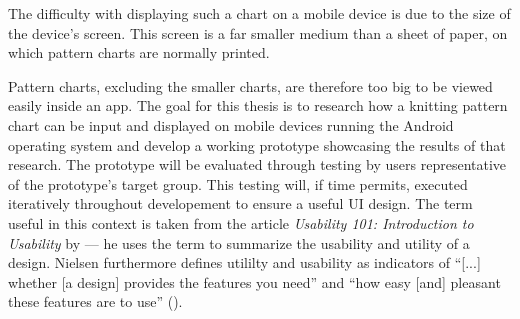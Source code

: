 The difficulty with displaying such a chart on a mobile device is due to the size of the device's screen. This screen is a far smaller medium than a sheet of paper, on which pattern charts are normally printed. 

Pattern charts, excluding the smaller charts, are therefore too big to be viewed easily inside an app. The goal for this thesis is to research how a knitting pattern chart can be input and displayed on mobile devices running the Android operating system and develop a working prototype showcasing the results of that research. The prototype will be evaluated through testing by users representative of the prototype's target group. This testing will, if time permits, executed iteratively throughout developement to ensure a useful \gls{UI} design. The term useful in this context is taken from the article \textit{Usability 101: Introduction to Usability} by \cite{nielsen2014} --- he uses the term to summarize the usability and utility of a design. Nielsen furthermore defines utililty and usability as indicators of ``[...] whether [a design] provides the features you need'' and ``how easy [and] pleasant these features are to use'' (\cite{nielsen2014}).